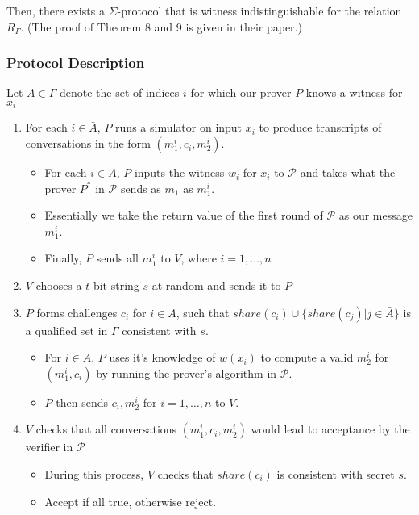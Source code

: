 Then, there exists a $\Sigma$-protocol that is witness indistinguishable for the relation $R_\Gamma$. (The proof of Theorem 8 and 9 is given in their paper.)

\subsubsection{Protocol Description}
Let $A \in \Gamma$ denote the set of indices $i$ for which our prover $P$ knows a witness for $x_i$

\begin{enumerate}
    \item For each $i \in \bar A$, $P$ runs a simulator on input $x_i$ to produce transcripts of conversations in the form $(m_1^i, c_i, m_2^i)$.
    \begin{itemize}
        \item For each $i \in A$, $P$ inputs the witness $w_i$ for $x_i$ to $\mathcal P$ and takes what the prover $P^*$ in $\mathcal P$ sends as $m_1$ as $m_1^i$.
        \item Essentially we take the return value of the first round of $\mathcal P$ as our message $m_1^i$.
        \item Finally, $P$ sends all $m_1^i$ to $V$, where $i = 1, \ldots, n$
    \end{itemize}
    \item $V$ chooses a $t$-bit string $s$ at random and sends it to $P$
    \item $P$ forms challenges $c_i$ for $i \in A$, such that $share(c_i) \cup \{share(c_j)|j \in \bar A\}$ is a qualified set in $\Gamma$ consistent with $s$.
    \begin{itemize}
        \item For $i \in A$, $P$ uses it's knowledge of $w(x_i)$ to compute a valid $m_2^i$ for $(m_1^i, c_i)$ by running the prover's algorithm in $\mathcal P$.
        \item $P$ then sends $c_i, m_2^i$ for $i = 1 ,\ldots, n$ to $V$. 
    \end{itemize}
    \item $V$ checks that all conversations $(m_1^i, c_i, m_2^i)$ would lead to acceptance by the verifier in $\mathcal P$
    \begin{itemize}
        \item During this process, $V$ checks that $share(c_i)$ is consistent with secret $s$.
        \item Accept if all true, otherwise reject. 
    \end{itemize}
\end{enumerate}

